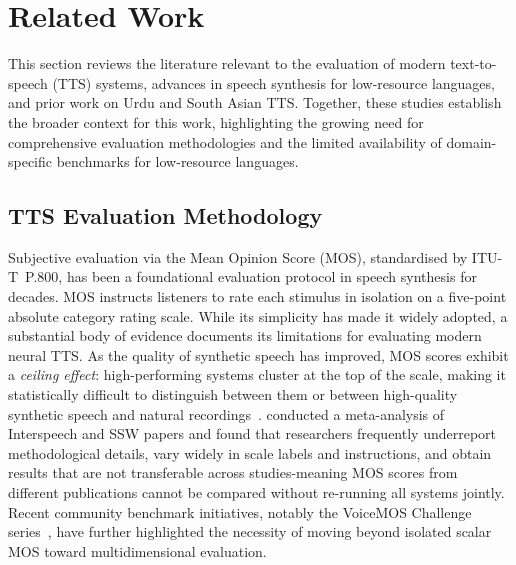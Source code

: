 \documentclass[a4paper,fleqn]{cas-dc}
\begin{document}
    
    
    \section{Related Work}\label{sec:related}

    This section reviews the literature relevant to the evaluation of modern text-to-speech (TTS) systems, advances in speech synthesis for low-resource languages, and prior work on Urdu and South Asian TTS. Together, these studies establish the broader context for this work, highlighting the growing need for comprehensive evaluation methodologies and the limited availability of domain-specific benchmarks for low-resource languages.

    \subsection{TTS Evaluation Methodology}\label{sec:related-eval}
    
    Subjective evaluation via the Mean Opinion Score (MOS), standardised by ITU-T~P.800,
    has been a foundational evaluation protocol in speech synthesis for decades. MOS
    instructs listeners to rate each stimulus in isolation on a five-point absolute
    category rating scale. While its simplicity has made it widely adopted, a
    substantial body of evidence documents its limitations for evaluating modern neural TTS.
    As the quality of synthetic speech has improved, MOS scores exhibit a
    \emph{ceiling effect}: high-performing systems cluster at the top of the scale,
    making it statistically difficult to distinguish between them or between high-quality
    synthetic speech and natural recordings~\citep{lemaguer2024limits}.
    \citet{kirkland2023mos} conducted a meta-analysis of Interspeech and SSW papers
    and found that researchers frequently underreport methodological details, vary widely in scale
    labels and instructions, and obtain results that are not transferable across
    studies-meaning MOS scores from different publications cannot be compared without
    re-running all systems jointly. Recent community benchmark initiatives, notably the VoiceMOS Challenge series~\citep{cooper2024voicemos}, have further highlighted the necessity of moving beyond isolated scalar MOS toward multidimensional evaluation.
    
\end{document}
